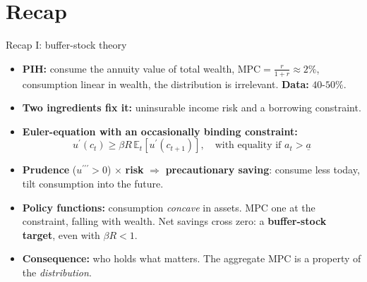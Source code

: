\documentclass[
  10pt,
  ignorenonframetext,
  aspectratio=43,
  english,
]{beamer}
\providecommand{\tightlist}{%
  \setlength{\itemsep}{0pt}\setlength{\parskip}{0pt}}
\begin{document}
\section{Recap}\label{recap}

\begin{frame}{Recap I: buffer-stock theory}
\protect{}\label{recap-i-buffer-stock-theory}
\begin{itemize}
\tightlist
\item
  \textbf{PIH:} consume the annuity value of total wealth, \(\text{MPC}=\frac{r}{1+r}\approx2\%\), consumption linear in wealth, the distribution is irrelevant. \textbf{Data:} \(40\)-\(50\%\).
\item
  \textbf{Two ingredients fix it:} uninsurable income risk and a borrowing constraint.
\item
  \textbf{Euler-equation with an occasionally binding constraint:}
  \[
  u^{\prime}(c_{t})\geq\beta R\,\mathbb{E}_{t}\left[u^{\prime}(c_{t+1})\right],\quad\text{with equality if }a_{t}>\underline{a}
  \]
\item
  \textbf{Prudence} (\(u^{\prime\prime\prime}>0\)) \(\times\) \textbf{risk} \(\Rightarrow\) \textbf{precautionary saving}: consume less today, tilt consumption into the future.
\item
  \textbf{Policy functions:} consumption \emph{concave} in assets. MPC one at the constraint, falling with wealth. Net savings cross zero: a \textbf{buffer-stock target}, even with \(\beta R<1\).
\item
  \textbf{Consequence:} who holds what matters. The aggregate MPC is a property of the \emph{distribution}.
\end{itemize}
\end{frame}
\end{document}
